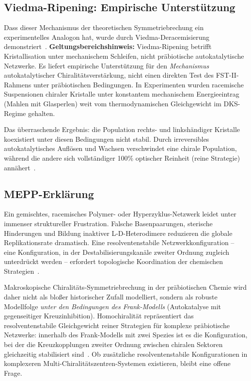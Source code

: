 \documentclass[12pt,a4paper]{article}
\theoremstyle{remark}
\begin{document}
\subsection{Viedma-Ripening: Empirische Unterstützung}

Dass dieser Mechanismus der theoretischen Symmetriebrechung ein experimentelles Analogon hat, wurde durch Viedma-Deracemisierung demonstriert~\citep{HomochiralityThermo}. \textbf{Geltungsbereichshinweis:} Viedma-Ripening betrifft Kristallisation unter mechanischem Schleifen, nicht präbiotische autokatalytische Netzwerke. Es liefert empirische Unterstützung für den \emph{Mechanismus} autokatalytischer Chiralitätsverstärkung, nicht einen direkten Test des FST-II-Rahmens unter präbiotischen Bedingungen. In Experimenten wurden racemische Suspensionen chiraler Kristalle unter konstantem mechanischem Energieeintrag (Mahlen mit Glasperlen) weit vom thermodynamischen Gleichgewicht im DKS-Regime gehalten.

Das überraschende Ergebnis: die Population rechts- und linkshändiger Kristalle koexistiert unter diesen Bedingungen nicht stabil. Durch irreversibles autokatalytisches Auflösen und Wachsen verschwindet eine chirale Population, während die andere sich vollständiger 100\% optischer Reinheit (reine Strategie) annähert~\citep{HomochiralityThermo}.

\subsection{MEPP-Erklärung}

Ein gemischtes, racemisches Polymer- oder Hyperzyklus-Netzwerk leidet unter immenser struktureller Frustration. Falsche Basenpaarungen, sterische Hinderungen und Bildung inaktiver L-D-Heterodimere reduzieren die globale Replikationsrate dramatisch. Eine resolventenstabile Netzwerkkonfiguration -- eine Konfiguration, in der Destabilisierungskanäle zweiter Ordnung zugleich unterdrückt werden -- erfordert topologische Koordination der chemischen Strategien~\citep{Biochirality}.

Makroskopische Chiralitäts-Symmetriebrechung in der präbiotischen Chemie wird daher nicht als bloßer historischer Zufall modelliert, sondern als robuste Modellfolge \emph{unter den Bedingungen des Frank-Modells} (Autokatalyse mit gegenseitiger Kreuzinhibition). Homochiralität repräsentiert das resolventenstabile Gleichgewicht reiner Strategien für komplexe präbiotische Netzwerke: innerhalb des Frank-Modells mit zwei Spezies ist es die Konfiguration, bei der die Kreuzkopplungen zweiter Ordnung zwischen chiralen Sektoren gleichzeitig stabilisiert sind~\citep{Biochirality}. Ob zusätzliche resolventenstabile Konfigurationen in komplexeren Multi-Chiralitätszentren-Systemen existieren, bleibt eine offene Frage.
\end{document}
